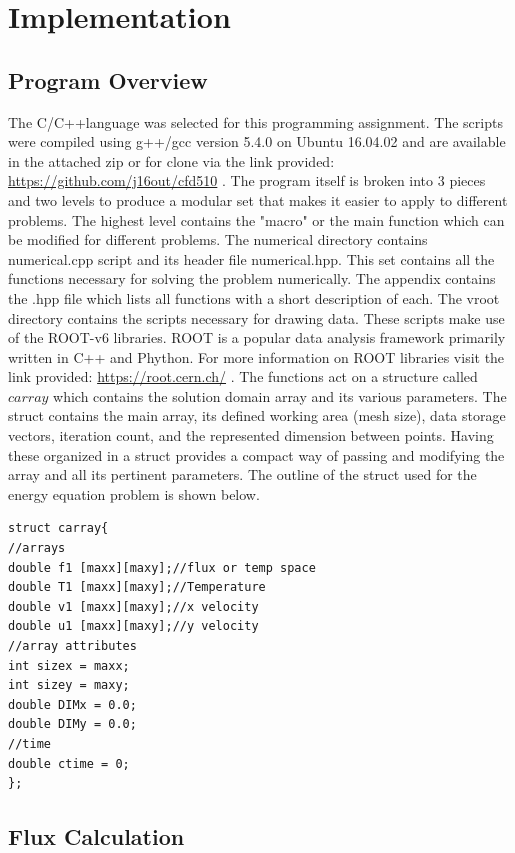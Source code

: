 \documentclass[paper=a4, fontsize=11pt, abstract=on]{scrartcl}
\numberwithin{equation}{section}		%
\numberwithin{figure}{section}			%
\numberwithin{table}{section}				%
\begin{document}
\section{Implementation}
\subsection{Program Overview}
The C/C++language was selected for this programming assignment. The scripts were compiled using g++/gcc version 5.4.0 on Ubuntu 16.04.02 and are available in the attached zip or for clone via the link provided: \url{https://github.com/j16out/cfd510} . The program itself is broken into 3 pieces and two levels to produce a modular set that makes it easier to apply to different problems. The highest level contains the "macro" or the main function which can be modified for different problems. 
The numerical directory contains numerical.cpp script and its header file numerical.hpp. This set contains all the functions necessary for solving the problem numerically. The appendix contains the .hpp file which lists all functions with a short description of each. The vroot directory contains the scripts necessary for drawing data. These scripts make use of the ROOT-v6 libraries. ROOT is a popular data analysis framework primarily written in C++ and Phython. For more information on ROOT libraries visit the link provided: \url{https://root.cern.ch/} .
The functions act on a structure called $carray$ which contains the solution domain array and its various parameters. The struct contains the main array, its defined working area (mesh size), data storage vectors, iteration count, and the represented dimension between points. Having these organized in a struct provides a compact way of passing and modifying the array and all its pertinent parameters. The outline of the struct used for the energy equation problem is shown below.

 

\begin{lstlisting}
struct carray{
//arrays
double f1 [maxx][maxy];//flux or temp space
double T1 [maxx][maxy];//Temperature
double v1 [maxx][maxy];//x velocity
double u1 [maxx][maxy];//y velocity
//array attributes
int sizex = maxx;
int sizey = maxy;
double DIMx = 0.0;
double DIMy = 0.0;
//time
double ctime = 0;
};
\end{lstlisting}
 
\subsection{Flux Calculation}
\end{document}
